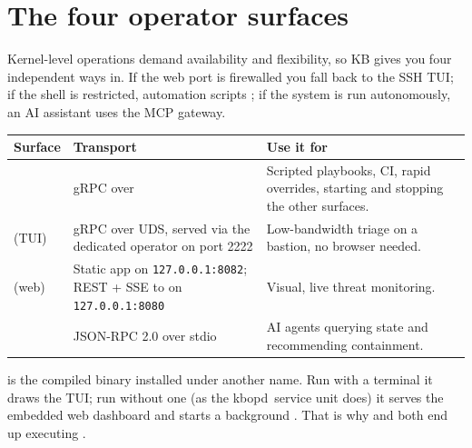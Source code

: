 \section{The four operator surfaces}
Kernel-level operations demand availability and flexibility, so KB gives you four independent ways in.
If the web port is firewalled you fall back to the SSH TUI; if the shell is restricted, automation
scripts ; if the system is run autonomously, an AI assistant uses the MCP gateway.

\begin{center}
\small
\begin{tabularx}{\textwidth}{@{}L{2.1cm}L{3.2cm}Y@{}}
\toprule
\textbf{Surface} & \textbf{Transport} & \textbf{Use it for}\\
\midrule
{} & gRPC over  & Scripted playbooks, CI, rapid overrides, starting and stopping the other surfaces.\\
 (TUI) & gRPC over UDS, served via the dedicated operator  on port 2222 & Low-bandwidth triage on a bastion, no browser needed.\\
 (web) & Static app on \texttt{127.0.0.1:8082}; REST + SSE to  on \texttt{127.0.0.1:8080} & Visual, live threat monitoring.\\
 & JSON-RPC 2.0 over stdio & AI agents querying state and recommending containment.\\
\bottomrule
\end{tabularx}
\end{center}

\begin{kbnote}
 is the compiled  binary installed under another name. Run with a terminal it
draws the TUI; run without one (as the \unit{kbopd.service} unit does) it serves the embedded web
dashboard and starts a background . That is why  and
 both end up executing .
\end{kbnote}

